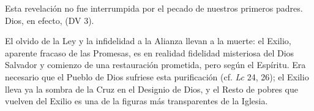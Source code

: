 
\begin{ccebody}
 Esta revelación no fue interrumpida por el pecado de nuestros primeros padres. Dios, en efecto,  (DV 3).
\end{ccebody}


\begin{ccebody}
 El olvido de la Ley y la infidelidad a la Alianza llevan a la muerte: el Exilio, aparente fracaso de las Promesas, es en realidad fidelidad misteriosa del Dios Salvador y comienzo de una restauración prometida, pero según el Espíritu. Era necesario que el Pueblo de Dios sufriese esta purificación (cf. \textit{Lc} 24, 26); el Exilio lleva ya la sombra de la Cruz en el Designio de Dios, y el Resto de pobres que vuelven del Exilio es una de la figuras más transparentes de la Iglesia.
\end{ccebody}